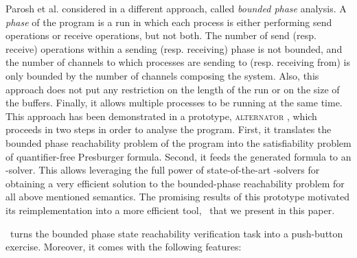 Parosh et al. considered in \cite{AAC13} a different approach, called \textit{bounded phase} analysis.
%
A \textit{phase} of the program is a run in which each process 
is either performing send operations or receive operations, but not both.
%
The number of send (resp. receive) operations within a sending (resp. receiving) phase
is not bounded, and the number of channels to which processes are sending to (resp. receiving from)
is only bounded by the number of channels composing the system.
%
Also, this approach does not put any restriction on the length of the
run or on the size of the buffers.
%
Finally, it allows multiple processes to be running at the same time.
This approach has been demonstrated in a prototype, \textsc{alternator} \cite{github.alternator},
which proceeds in two steps in order to analyse the program.
%
First, it translates the bounded phase reachability problem of the program into the satisfiability problem of quantifier-free Presburger formula.
Second, it feeds the generated formula to an \SMT-solver.
%
This allows leveraging the full power of state-of-the-art
\SMT-solvers for obtaining a very efficient solution to the bounded-phase reachability problem for all above mentioned semantics. 
%
%
The promising results of this prototype motivated its reimplementation into a more efficient tool, \MPass\, that we present in this paper.

\MPass\ turns the bounded phase state reachability verification task into a push-button exercise.
Moreover, it comes with the following features:

